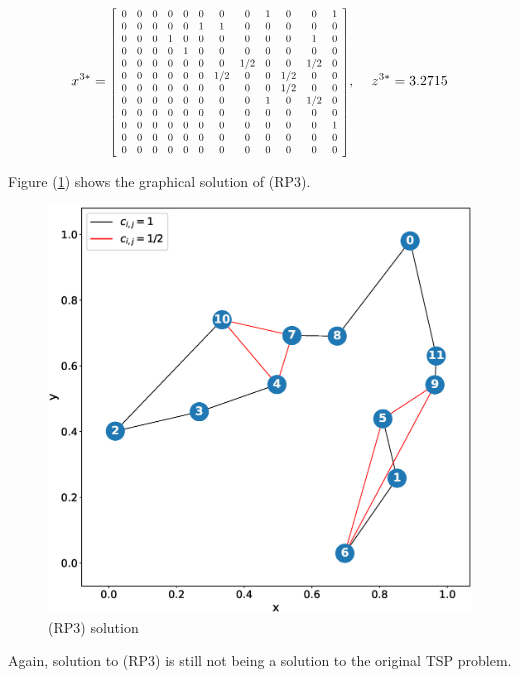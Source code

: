 \documentclass[12pt]{article}
\begin{document}
\begin{equation}
    x^{3*} = 
\resizebox{0.5\linewidth}{!}{$
        \left[ \begin {array}{cccccccccccc} 
        
         0&0&0&0&0&0&0&0&1&0&0&1\\
         0&0&0&0&0&1&1&0&0&0&0&0\\
         0&0&0&1&0&0&0&0&0&0&1&0\\
         0&0&0&0&1&0&0&0&0&0&0&0\\
         0&0&0&0&0&0&0&1/2&0&0&1/2&0\\
         0&0&0&0&0&0&1/2&0&0&1/2&0&0\\
         0&0&0&0&0&0&0&0&0&1/2&0&0\\
         0&0&0&0&0&0&0&0&1&0&1/2&0\\
         0&0&0&0&0&0&0&0&0&0&0&0\\
         0&0&0&0&0&0&0&0&0&0&0&1\\
         0&0&0&0&0&0&0&0&0&0&0&0\\
         0&0&0&0&0&0&0&0&0&0&0&0\\
        \end {array}
        \right]     
$}
\text{, } \quad z^{3*} = 3.2715
\end{equation}

Figure (\ref{ff7}) shows the graphical solution of (RP3).
\begin{figure}[H]
\centering
    \includegraphics[width=0.7\linewidth]{f8.eps} 
  \caption{(RP3) solution}
  \label{ff7}
\end{figure}
Again, solution to (RP3) is still not being a solution to the original TSP problem.
\end{document}

